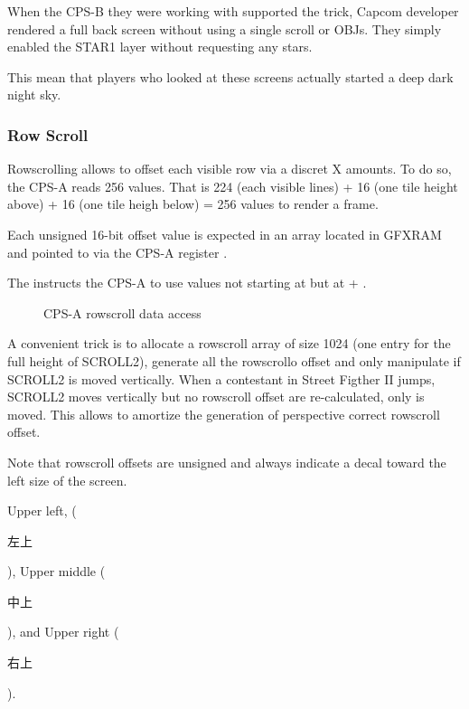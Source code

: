 \begin{trivia}
When the CPS-B they were working with supported the trick, Capcom developer rendered a full back screen without using a single scroll or OBJs. They simply enabled the STAR1 layer without requesting any stars. 

This mean that players who looked at these screens actually started a deep dark night sky.
\end{trivia}

\pagebreak


\subsubsection{Row Scroll}
Rowscrolling allows to offset each visible row via a discret X amounts. To do so, the CPS-A reads 256 values. That is 224 (each visible lines) + 16 (one tile height above) + 16 (one tile heigh below) = 256 values to render a frame.

Each unsigned 16-bit offset value is expected in an array located in GFXRAM and pointed to via the CPS-A register .

The  instructs the CPS-A to use values not starting at  but at  + . 

\begin{figure}[H]
 \caption*{CPS-A rowscroll data access}%
 \end{figure}%

A convenient trick is to allocate a rowscroll array of size 1024 (one entry for the full height of SCROLL2), generate all the rowscrollo offset and only manipulate  if SCROLL2 is moved vertically. When a contestant in Street Figther II jumps, SCROLL2 moves vertically but no rowscroll offset are re-calculated, only   is moved. This allows to amortize the generation of perspective correct rowscroll offset.

 

Note that rowscroll offsets are unsigned and always indicate a decal toward the left size of the screen. 

Upper left, (\begin{CJK}{UTF8}{min}左上\end{CJK}), Upper middle (\begin{CJK}{UTF8}{min}中上\end{CJK}), and  Upper right (\begin{CJK}{UTF8}{min}右上\end{CJK}).

